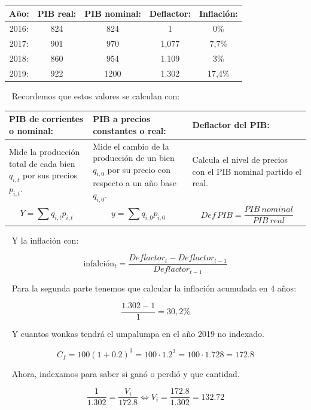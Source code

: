 \documentclass[
  letterpaper,
  DIV=11,
  numbers=noendperiod]{scrreport}
\begin{document}
\begin{table}[h]
    \centering
    \begin{tabular}{|c|c|c|c|c|}
    \hline
      Año: & PIB real: & PIB nominal: & Deflactor: & Inflación: \\\hline
      2016: & 824 & 824 & 1 & 0\% \\\hline
      2017: & 901 & 970 & 1,077 & 7,7\% \\\hline
      2018: & 860 & 954 & 1.109 & 3\% \\\hline
      2019: & 922 & 1200 & 1.302 & 17,4\% \\\hline
    \end{tabular}
\end{table}

~ Recordemos que estos valores se calculan con:

\begin{table}[h]
    \centering
    \begin{tabular}{|p{40mm}|p{40mm}|p{50mm}|}
        \hline
        PIB de corrientes o nominal: & PIB a precios constantes o real: & Deflactor del PIB: \\ \hline
        Mide la producción total de cada bien $q_{i,t}$ por sus precios $p_{i,t}$. & Mide el cambio de la producción de un bien $q_{i,0}$ por su precio con respecto a un año base $q_{i,0}$.  & Calcula el nivel de precios con el PIB nominal partido el real. \\ \hline
        \[Y=\sum{q_{i,t}p_{i,t}}\] & \[y=\sum{q_{i,0}p_{i,0}}\] & \[Def \, PIB =\frac{PIB\ nominal}{PIB\ real}\] \\ \hline
    \end{tabular}
    
\end{table}

~ Y la inflación con:

\[
\textrm{infalción}_t=\frac{Deflactor_t-Deflactor_{t-1}}{Deflactor_{t-1}}
\]

~ Para la segunda parte tenemos que calcular la inflación acumulada en 4
años:

\[
\frac{1.302-1}{1}=30,2\%
\]

~ Y cuantos wonkas tendrá el umpalumpa en el año 2019 no indexado.

\[
C_f=100(1+0.2)^3=100\cdot 1.2^3=100\cdot 1.728=172.8
\]

~ Ahora, indexamos para saber si ganó o perdió y que cantidad.

\[
\frac{1}{1.302}=\frac{V_i}{172.8}\Leftrightarrow V_i=\frac{172.8}{1.302}=132.72
\]
\end{document}
